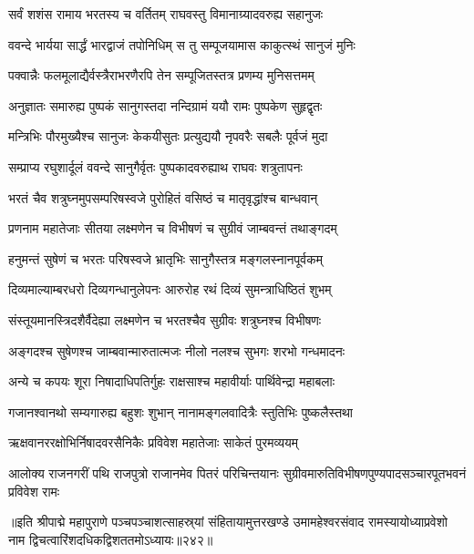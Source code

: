 \twolineshloka
{सर्वं शशंस रामाय भरतस्य च वर्तितम्}
{राघवस्तु विमानाग्र्यादवरुह्य सहानुजः}%

\twolineshloka
{ववन्दे भार्यया सार्द्धं भारद्वाजं तपोनिधिम्}
{स तु सम्पूजयामास काकुत्स्थं सानुजं मुनिः}%

\twolineshloka
{पक्वान्नैः फलमूलाद्यैर्वस्त्रैराभरणैरपि}
{तेन सम्पूजितस्तत्र प्रणम्य मुनिसत्तमम्}%

\twolineshloka
{अनुज्ञातः समारुह्य पुष्पकं सानुगस्तदा}
{नन्दिग्रामं ययौ रामः पुष्पकेण सुहृद्वृतः}%

\twolineshloka
{मन्त्रिभिः पौरमुख्यैश्च सानुजः केकयीसुतः}
{प्रत्युद्ययौ नृपवरैः सबलैः पूर्वजं मुदा}%

\twolineshloka
{सम्प्राप्य रघुशार्दूलं ववन्दे सानुगैर्वृतः}
{पुष्पकादवरुह्याथ राघवः शत्रुतापनः}%

\twolineshloka
{भरतं चैव शत्रुघ्नमुपसम्परिषस्वजे}
{पुरोहितं वसिष्ठं च मातृवृद्धांश्च बान्धवान्}%

\twolineshloka
{प्रणनाम महातेजाः सीतया लक्ष्मणेन च}
{विभीषणं च सुग्रीवं जाम्बवन्तं तथाङ्गदम्}%

\twolineshloka
{हनुमन्तं सुषेणं च भरतः परिषस्वजे}
{भ्रातृभिः सानुगैस्तत्र मङ्गलस्नानपूर्वकम्}%

\twolineshloka
{दिव्यमाल्याम्बरधरो दिव्यगन्धानुलेपनः}
{आरुरोह रथं दिव्यं सुमन्त्राधिष्ठितं शुभम्}%

\twolineshloka
{संस्तूयमानस्त्रिदशैर्वैदेह्या लक्ष्मणेन च}
{भरतश्चैव सुग्रीवः शत्रुघ्नश्च विभीषणः}%

\twolineshloka
{अङ्गदश्च सुषेणश्च जाम्बवान्मारुतात्मजः}
{नीलो नलश्च सुभगः शरभो गन्धमादनः}%

\twolineshloka
{अन्ये च कपयः शूरा निषादाधिपतिर्गुहः}
{राक्षसाश्च महावीर्याः पार्थिवेन्द्रा महाबलाः}%

\twolineshloka
{गजानश्वानथो सम्यगारुह्य बहुशः शुभान्}
{नानामङ्गलवादित्रैः स्तुतिभिः पुष्कलैस्तथा}%

\twolineshloka
{ऋक्षवानररक्षोभिर्निषादवरसैनिकैः}
{प्रविवेश महातेजाः साकेतं पुरमव्ययम्}%

\twolineshloka
{आलोक्य राजनगरीं पथि राजपुत्रो राजानमेव पितरं परिचिन्तयानः}
{सुग्रीवमारुतिविभीषणपुण्यपादसञ्चारपूतभवनं प्रविवेश रामः}%

॥इति श्रीपाद्मे महापुराणे पञ्चपञ्चाशत्साहस्र्यां संहितायामुत्तरखण्डे उमामहेश्वरसंवाद रामस्यायोध्याप्रवेशो नाम द्विचत्वारिंशदधिकद्विशततमोऽध्यायः॥२४२॥



